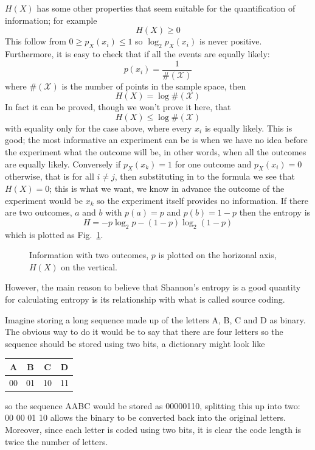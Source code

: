 \documentclass[12pt]{article}
\begin{document}
$H(X)$ has some other properties that seem suitable for the
quantification of information; for example
\begin{equation}
H(X)\ge 0
\end{equation}
This follow from $0\ge p_X(x_i)\le 1$ so $\log_2{p_X(x_i)}$ is never
positive. Furthermore, it is easy to check that if all the events are equally likely:
\begin{equation}
p(x_i)=\frac{1}{\#(\mathcal{X})}
\end{equation}
where $\#(\mathcal{X})$ is the number of points in the sample space, then
\begin{equation}
H(X)=\log{\#(\mathcal{X})}
\end{equation}
In fact it can be proved, though we won't prove it here, that
\begin{equation}
H(X)\le \log{\#(\mathcal{X})}
\end{equation}
with equality only for the case above, where every $x_i$ is equally
likely. This is good; the most informative an experiment can be is
when we have no idea before the experiment what the outcome will be,
in other words, when all the outcomes are equally likely. Conversely
if $p_X(x_k)=1$ for one outcome and $p_X(x_i)=0$ otherwise, that is for
all $i\not=j$, then substituting in to the formula we see that
$H(X)=0$; this is what we want, we know in advance the outcome of the
experiment would be $x_k$ so the experiment itself provides no
information. If there are two outcomes, $a$ and $b$ with $p(a)=p$ and
$p(b)=1-p$ then the entropy is
\begin{equation}
H=-p\log_2{p}-(1-p)\log_2{(1-p)}
\end{equation}
which is plotted as Fig.~\ref{fig_two_outcomes}.

\begin{figure}
\begin{center}

\end{center}
\caption{Information with two outcomes, $p$ is plotted on the
  horizonal axis, $H(X)$ on the vertical.\label{fig_two_outcomes}}
\end{figure}

However, the main reason to believe that Shannon's entropy is a good
quantity for calculating entropy is its relationship with what is
called source coding. 

Imagine storing a long sequence made up of the letters A, B, C and D
as binary. The obvious way to do it would be to say that there are
four letters so the sequence should be stored using two bits, a
dictionary might look like
\begin{center}
\begin{tabular}{cccc}
A&B&C&D\\
\hline
00&01&10&11
\end{tabular}
\end{center}
so the sequence AABC would be stored as 00000110, splitting this up
into two: 00 00 01 10 allows the binary to be converted back into the
original letters. Moreover, since each letter is coded using two bits,
it is clear the code length is twice the number of letters. 
\end{document}
